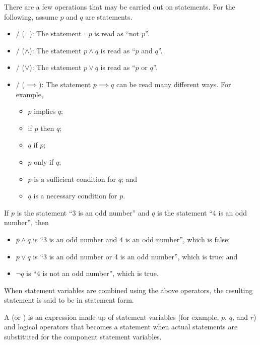 There are a few operations that may be carried out on statements. For the following, assume $p$ and $q$ are statements.
\begin{itemize}
    \item {}/ ($\lnot$): The statement $\lnot p$ is read as ``not $p$''.
    \item {}/ ($\land$): The statement $p\land q$ is read as ``$p$ and $q$''.
    \item {}/ ($\lor$): The statement $p\lor q$ is read as ``$p$ or $q$''.
    \item {}/ ($\implies$): The statement $p \implies q$ can be read many different ways. For example,
    \begin{itemize}
        \item $p$ implies $q$;
        \item if $p$ then $q$;
        \item $q$ if $p$;
        \item $p$ only if $q$;
        \item $p$ is a sufficient condition for $q$; and
        \item $q$ is a necessary condition for $p$.
    \end{itemize}
\end{itemize}

\begin{example}
    If $p$ is the statement ``3 is an odd number'' and $q$ is the statement ``4 is an odd number'', then
    \begin{itemize}
        \item $p\land q$ is ``3 is an odd number and 4 is an odd number'', which is false;
        \item $p\lor q$ is ``3 is an odd number or 4 is an odd number'', which is true; and
        \item $\lnot q$ is ``4 is not an odd number'', which is true.
    \end{itemize}
\end{example}

When statement variables are combined using the above operators, the resulting statement is said to be in statement form.
\begin{definition}
    A  (or ) is an expression made up of statement variables (for example, $p$, $q$, and $r$) and logical operators that becomes a statement when actual statements are substituted for the component statement variables.
\end{definition}

